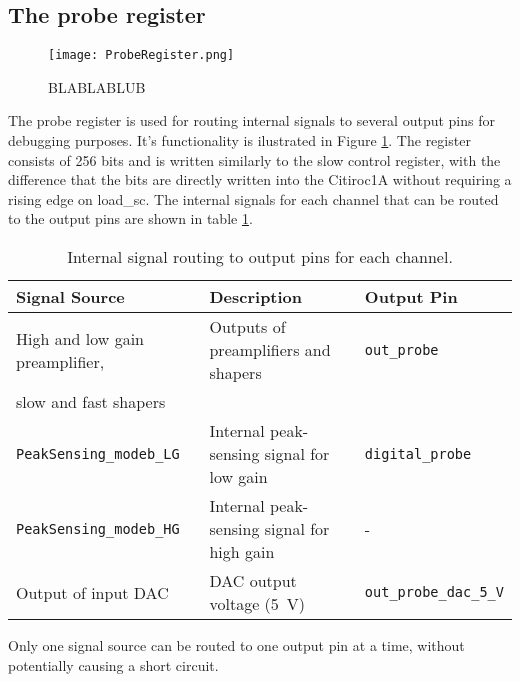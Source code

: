 \subsection{The probe register}
\begin{figure}[H]
    \centering
    \texttt{[image: ProbeRegister.png]}
    \caption{BLABLABLUB\autocite{datasheetCITIROC}}
    \label{fig:CITIROC1A_proberegiseter}
\end{figure}
The probe register is used for routing internal signals to several output pins for debugging purposes.
It's functionality is ilustrated in Figure \ref{fig:CITIROC1A_proberegiseter}.
The register consists of 256 bits and is written similarly to the slow control register,
 with the difference that the bits are directly written into the Citiroc1A without requiring a rising edge on load\_sc.
\newline
The internal signals for each channel that can be routed to the output pins are shown in table \ref{tab:probe_register}. 
 \begin{table}[h!]
    \centering
    \begin{tabular}{@{}lll@{}}
    \toprule
    \textbf{Signal Source} & \textbf{Description}                   & \textbf{Output Pin}        \\ \midrule
    High and low gain preamplifier, & Outputs of preamplifiers and shapers & \texttt{out\_probe}        \\
    slow and fast shapers                                                   &                          \\ \midrule
    \texttt{PeakSensing\_modeb\_LG} & Internal peak-sensing signal for low gain & \texttt{digital\_probe}    \\
    \texttt{PeakSensing\_modeb\_HG} & Internal peak-sensing signal for high gain & -    \\ \midrule
    Output of input DAC            & DAC output voltage (\SI{5}{\volt})  & \texttt{out\_probe\_dac\_5\_V} \\ \bottomrule
    \end{tabular}
    \caption{Internal signal routing to output pins for each channel.}
    \label{tab:probe_register}
\end{table}
\newline
Only one signal source can be routed to one output pin at a time, without potentially causing a short circuit.








 


